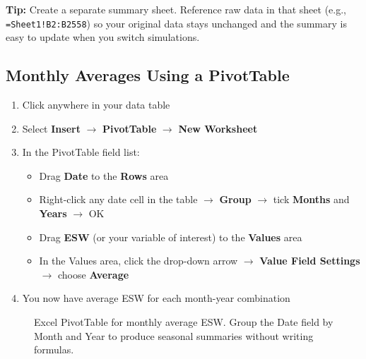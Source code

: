 \begin{tipbox}
\textbf{Tip:} Create a separate summary sheet. Reference raw data in that sheet (e.g., \texttt{=Sheet1!B2:B2558}) so your original data stays unchanged and the summary is easy to update when you switch simulations.
\end{tipbox}

\subsection{Monthly Averages Using a PivotTable}

\begin{enumerate}
  \item Click anywhere in your data table
  \item Select \textbf{Insert} $\to$ \textbf{PivotTable} $\to$ \textbf{New Worksheet}
  \item In the PivotTable field list:
    \begin{itemize}
      \item Drag \textbf{Date} to the \textbf{Rows} area
      \item Right-click any date cell in the table $\to$ \textbf{Group} $\to$ tick \textbf{Months} and \textbf{Years} $\to$ OK
      \item Drag \textbf{ESW} (or your variable of interest) to the \textbf{Values} area
      \item In the Values area, click the drop-down arrow $\to$ \textbf{Value Field Settings} $\to$ choose \textbf{Average}
    \end{itemize}
  \item You now have average ESW for each month-year combination
\end{enumerate}

\begin{figure}[H]
  \centering
  \caption{Excel PivotTable for monthly average ESW. Group the Date field by Month and Year to produce seasonal summaries without writing formulas.}
  \label{fig:excel-pivot}
\end{figure}

